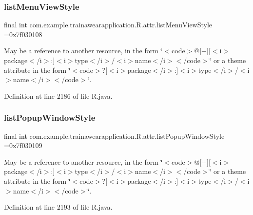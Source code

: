 \subsubsection{\texorpdfstring{listMenuViewStyle}{listMenuViewStyle}}
{\footnotesize\ttfamily final int com.\+example.\+trainawearapplication.\+R.\+attr.\+list\+Menu\+View\+Style =0x7f030108\hspace{0.3cm}{\ttfamily [static]}}

May be a reference to another resource, in the form \char`\"{}$<$code$>$@\mbox{[}+\mbox{]}\mbox{[}$<$i$>$package$<$/i$>$\+:\mbox{]}$<$i$>$type$<$/i$>$/$<$i$>$name$<$/i$>$$<$/code$>$\char`\"{} or a theme attribute in the form \char`\"{}$<$code$>$?\mbox{[}$<$i$>$package$<$/i$>$\+:\mbox{]}$<$i$>$type$<$/i$>$/$<$i$>$name$<$/i$>$$<$/code$>$\char`\"{}. 

Definition at line 2186 of file R.\+java.

\mbox{\label{classcom_1_1example_1_1trainawearapplication_1_1_r_1_1attr_ab3e9100201566b9005ed977a07d783ed}} 
\subsubsection{\texorpdfstring{listPopupWindowStyle}{listPopupWindowStyle}}
{\footnotesize\ttfamily final int com.\+example.\+trainawearapplication.\+R.\+attr.\+list\+Popup\+Window\+Style =0x7f030109\hspace{0.3cm}{\ttfamily [static]}}

May be a reference to another resource, in the form \char`\"{}$<$code$>$@\mbox{[}+\mbox{]}\mbox{[}$<$i$>$package$<$/i$>$\+:\mbox{]}$<$i$>$type$<$/i$>$/$<$i$>$name$<$/i$>$$<$/code$>$\char`\"{} or a theme attribute in the form \char`\"{}$<$code$>$?\mbox{[}$<$i$>$package$<$/i$>$\+:\mbox{]}$<$i$>$type$<$/i$>$/$<$i$>$name$<$/i$>$$<$/code$>$\char`\"{}. 

Definition at line 2193 of file R.\+java.

\mbox{\label{classcom_1_1example_1_1trainawearapplication_1_1_r_1_1attr_a4462ad7c7732c7e27c9e79e7edadf79b}} 

